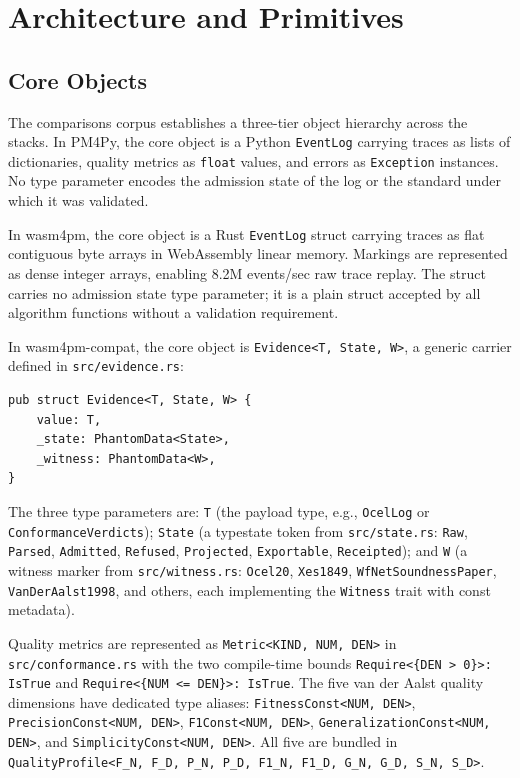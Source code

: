 
\section{Architecture and Primitives}
\label{sec:comparisons-arch}

\subsection{Core Objects}
\label{sec:comparisons-arch-objects}

The comparisons corpus establishes a three-tier object hierarchy across the stacks.
In PM4Py, the core object is a Python \texttt{EventLog} carrying traces as lists
of dictionaries, quality metrics as \texttt{float} values, and errors as
\texttt{Exception} instances. No type parameter encodes the admission state of
the log or the standard under which it was validated.

In wasm4pm, the core object is a Rust \texttt{EventLog} struct carrying traces
as flat contiguous byte arrays in WebAssembly linear memory. Markings are
represented as dense integer arrays, enabling 8.2M events/sec raw trace replay.
The struct carries no admission state type parameter; it is a plain struct
accepted by all algorithm functions without a validation requirement.

In wasm4pm-compat, the core object is \texttt{Evidence<T, State, W>}, a generic
carrier defined in \texttt{src/evidence.rs}:

\begin{verbatim}
pub struct Evidence<T, State, W> {
    value: T,
    _state: PhantomData<State>,
    _witness: PhantomData<W>,
}
\end{verbatim}

The three type parameters are: \texttt{T} (the payload type, e.g., \texttt{OcelLog}
or \texttt{ConformanceVerdicts}); \texttt{State} (a typestate token from
\texttt{src/state.rs}: \texttt{Raw}, \texttt{Parsed}, \texttt{Admitted},
\texttt{Refused}, \texttt{Projected}, \texttt{Exportable}, \texttt{Receipted});
and \texttt{W} (a witness marker from \texttt{src/witness.rs}: \texttt{Ocel20},
\texttt{Xes1849}, \texttt{WfNetSoundnessPaper}, \texttt{VanDerAalst1998}, and
others, each implementing the \texttt{Witness} trait with const metadata).

Quality metrics are represented as \texttt{Metric<KIND, NUM, DEN>} in
\texttt{src/conformance.rs} with the two compile-time bounds
\texttt{Require<\{DEN > 0\}>: IsTrue} and \texttt{Require<\{NUM <= DEN\}>: IsTrue}.
The five van der Aalst quality dimensions have dedicated type aliases:
\texttt{FitnessConst<NUM, DEN>}, \texttt{PrecisionConst<NUM, DEN>},
\texttt{F1Const<NUM, DEN>}, \texttt{GeneralizationConst<NUM, DEN>}, and
\texttt{SimplicityConst<NUM, DEN>}. All five are bundled in
\texttt{QualityProfile<F\_N, F\_D, P\_N, P\_D, F1\_N, F1\_D, G\_N, G\_D, S\_N, S\_D>}.


